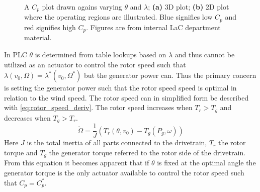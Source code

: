 \begin{figure}[ht]
	\centering
	
	\hfil
	
	\caption{A $ C_p $ plot drawn agains varying $ \theta $ and $ \lambda $; \textbf{(a)} 3D plot; \textbf{(b)} 2D plot where the operating regions are illustrated. Blue signifies low $ C_p $ and red signifies high $ C_p $. Figures are from internal LaC department material.}
	\label{fig:cp_plot}
\end{figure}

In PLC $ \theta $ is determined from table lookups based on $ \lambda $ and thus cannot be utilized as an actuator to control the rotor speed such that $ \lambda(v_0, \Omega) = \lambda^*(v_0, \Omega^*) $ but the generator power can. Thus the primary concern is setting the generator power such that the rotor speed speed is optimal in relation to the wind speed. The rotor speed can in simplified form be described with \cref{eq:rotor_speed_deriv}. The rotor speed increases when $ T_r > T_g $ and decreases when $ T_g > T_r $.
\begin{equation}\label{eq:rotor_speed_deriv}
	\dot{\Omega} = \dfrac{1}{J} \left( T_r(\theta, v_0) - T_g(P_g, \omega) \right)
\end{equation}
Here $ J $ is the total inertia of all parts connected to the drivetrain, $ T_r $ the rotor torque and $ T_g $ the generator torque referred to the rotor side of the drivetrain. From this equation it becomes apparent that if $ \theta $ is fixed at the optimal angle the generator torque is the only actuator available to control the rotor speed such that $ C_p = C_p^* $.


